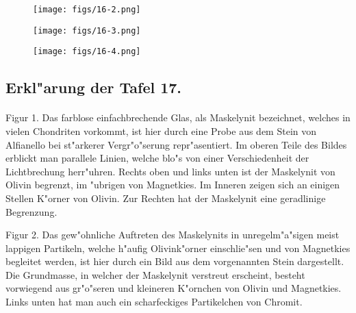 \documentclass[a4paper, 11pt, oneside, polutonikogreek, german]{article}
\begin{document}
\vspace*{\fill}
\begin{figure}[H]
\centering
\texttt{[image: figs/16-2.png]}
\caption{}
\end{figure}
\vspace*{\fill}
\clearpage

\vspace*{\fill}
\begin{figure}[H]
\centering
\texttt{[image: figs/16-3.png]}
\caption{}
\end{figure}
\vspace*{\fill}
\clearpage

\vspace*{\fill}
\begin{figure}[H]
\centering
\texttt{[image: figs/16-4.png]}
\caption{}
\end{figure}
\vspace*{\fill} 
\clearpage

\subsection{Erkl"arung der Tafel 17.}
\paragraph{}
Figur 1. Das farblose einfachbrechende Glas, als Maskelynit bezeichnet, welches in vielen Chondriten vorkommt, ist hier durch eine Probe aus dem Stein von Alfianello bei st"arkerer Vergr"o"serung repr"asentiert. Im oberen Teile des Bildes erblickt man parallele Linien, welche blo"s von einer Verschiedenheit der Lichtbrechung herr"uhren. Rechts oben und links unten ist der Maskelynit von Olivin begrenzt, im "ubrigen von Magnetkies. Im Inneren zeigen sich an einigen Stellen K"orner von Olivin. Zur Rechten hat der Maskelynit eine geradlinige Begrenzung.

Figur 2. Das gew"ohnliche Auftreten des Maskelynits in unregelm"a"sigen meist lappigen Partikeln, welche h"aufig Olivink"orner einschlie"sen und von Magnetkies begleitet werden, ist hier durch ein Bild aus dem vorgenannten Stein dargestellt. Die Grundmasse, in welcher der Maskelynit verstreut erscheint, besteht vorwiegend aus gr"o"seren und kleineren K"ornchen von Olivin und Magnetkies. Links unten hat man auch ein scharfeckiges Partikelchen von Chromit.
\end{document}
